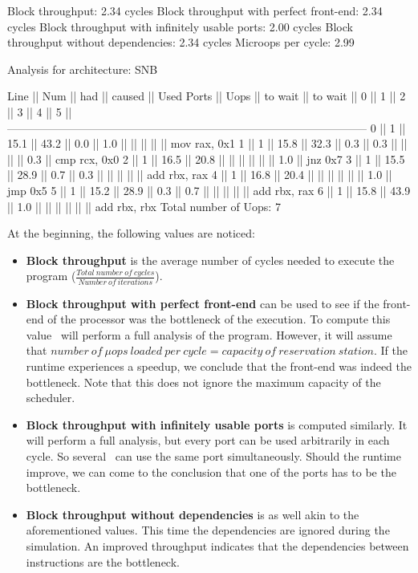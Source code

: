 \begin{example}
    Block throughput: 2.34 cycles
    Block throughput with perfect front-end: 2.34 cycles
    Block throughput with infinitely usable ports: 2.00 cycles
    Block throughput without dependencies: 2.34 cycles
    Microops per cycle: 2.99
    
    Analysis for architecture: SNB
    
     Line  ||   Num   ||   had   || caused  ||            Used Ports
           ||   Uops  || to wait || to wait ||   0   ||   1   ||   2   ||   3   ||   4   ||   5   ||
    ------------------------------------------------------------------------------------------------
       0   ||    1    ||  15.1   ||  43.2   ||  0.0  ||  1.0  ||       ||       ||       ||       || mov rax, 0x1
       1   ||    1    ||  15.8   ||  32.3   ||  0.3  ||  0.3  ||       ||       ||       ||  0.3  || cmp rcx, 0x0
       2   ||    1    ||  16.5   ||  20.8   ||       ||       ||       ||       ||       ||  1.0  || jnz 0x7
       3   ||    1    ||  15.5   ||  28.9   ||  0.7  ||  0.3  ||       ||       ||       ||       || add rbx, rax
       4   ||    1    ||  16.8   ||  20.4   ||       ||       ||       ||       ||       ||  1.0  || jmp 0x5
       5   ||    1    ||  15.2   ||  28.9   ||  0.3  ||  0.7  ||       ||       ||       ||       || add rbx, rax
       6   ||    1    ||  15.8   ||  43.9   ||  1.0  ||       ||       ||       ||       ||       || add rbx, rbx
    Total number of Uops: 7
\end{example}




At the beginning, the following values are noticed:
\begin{itemize}
    \item \textbf{Block throughput} is the average number of cycles needed to execute the program ($\frac{Total\ number\ of\ cycles}{Number\ of\ iterations}$).
    \item \textbf{Block throughput with perfect front-end} can be used to see if the front-end of the processor was the bottleneck of the execution. To compute this value \suaca\ will perform a full analysis of the program. However, it will assume that $number\ of\ \mu ops\ loaded\ per\ cycle = capacity\ of\ reservation\ station$. If the runtime experiences a speedup, we conclude that the front-end was indeed the bottleneck. Note that this does not ignore the maximum capacity of the scheduler.
    \item \textbf{Block throughput with infinitely usable ports} is computed similarly. It will perform a full analysis, but every port can be used arbitrarily in each cycle. So several \microops\ can use the same port simultaneously. Should the runtime improve, we can come to the conclusion that one of the ports has to be the bottleneck.
    \item \textbf{Block throughput without dependencies} is as well akin to the aforementioned values. This time the dependencies are ignored during the simulation. An improved throughput indicates that the dependencies between instructions are the bottleneck. 
\end{itemize}

